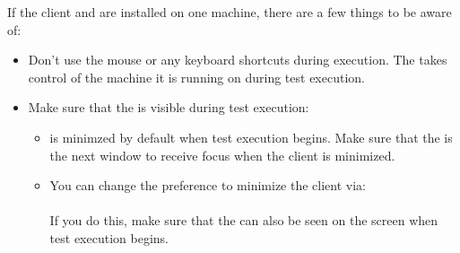 

If the \gd{} client and \gdserver are installed on one machine, there are a few things to be aware of:
\begin{itemize}
\item Don't use the mouse or any keyboard shortcuts during execution. The \gdaut{} takes control of the machine it is running on during test execution.
\item Make sure that the \gdaut{} is visible during test execution:
\begin{itemize}
\item \gd is minimzed by default when test execution begins. Make sure that the \gdaut{} is the next window to receive focus when the client is minimized. 
\item You can change the preference to minimize the client via:\\
\\
If you do this, make sure that the \gdaut{} can also be seen on the screen when test execution begins. 
 \end{itemize}
\end{itemize}
